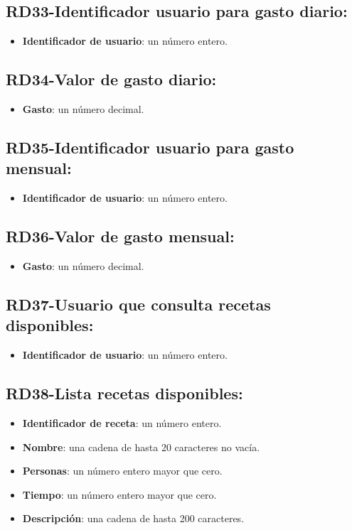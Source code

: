 \documentclass[a4paper,12pt]{report}
\begin{document}
\subsection{RD33-Identificador usuario para gasto diario:}
\label{sec-2-1-33}
\begin{itemize}
\item \textbf{Identificador de usuario}: un número entero.
\end{itemize}
\subsection{RD34-Valor de gasto diario:}
\label{sec-2-1-34}
\begin{itemize}
\item \textbf{Gasto}: un número decimal.
\end{itemize}
\subsection{RD35-Identificador usuario para gasto mensual:}
\label{sec-2-1-35}
\begin{itemize}
\item \textbf{Identificador de usuario}: un número entero.
\end{itemize}
\subsection{RD36-Valor de gasto mensual:}
\label{sec-2-1-36}
\begin{itemize}
\item \textbf{Gasto}: un número decimal.
\end{itemize}
\subsection{RD37-Usuario que consulta recetas disponibles:}
\label{sec-2-1-37}
\begin{itemize}
\item \textbf{Identificador de usuario}: un número entero.
\end{itemize}
\subsection{RD38-Lista recetas disponibles:}
\label{sec-2-1-38}
\begin{itemize}
\item \textbf{Identificador de receta}: un número entero.
\item \textbf{Nombre}: una cadena de hasta 20 caracteres no vacía.
\item \textbf{Personas}: un número entero mayor que cero.
\item \textbf{Tiempo}: un número entero mayor que cero.
\item \textbf{Descripción}: una cadena de hasta 200 caracteres.
\end{itemize}
\end{document}
